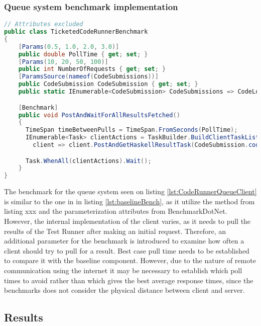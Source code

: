 \subsubsection{Queue system benchmark implementation}
\begin{lstlisting}[language=cs, escapechar=~, caption={C\# code showing xxxxxx}, label={lst:queueSystemBench}]
// Attributes excluded
public class TicketedCodeRunnerBenchmark
{
    [Params(0.5, 1.0, 2.0, 3.0)] 
    public double PollTime { get; set; }
    [Params(10, 20, 50, 100)] 
    public int NumberOfRequests { get; set; }
    [ParamsSource(nameof(CodeSubmissions))] 
    public CodeSubmission CodeSubmission { get; set; }
    public static IEnumerable<CodeSubmission> CodeSubmissions => CodeLoader.Load();

    [Benchmark]
    public void PostAndWaitForAllResultsFetched()
    {
      TimeSpan timeBetweenPulls = TimeSpan.FromSeconds(PollTime);
      IEnumerable<Task> clientActions = TaskBuilder.BuildClientTaskList<CodeRunnerQueueClient>(NumberOfConcurrentRequests, 
        client => client.PostAndGetHaskellResultTask(CodeSubmission.code, CodeSubmission.test, timeBetweenPulls));

      Task.WhenAll(clientActions).Wait();
    }
}
\end{lstlisting}

The benchmark for the queue system seen on listing \ref{lst:CodeRunnerQueueClient} is similar to the one in in listing \ref{lst:baselineBench}, as it utilize the method from listing xxx and the parameterization attributes from BenchmarkDotNet. However, the internal implementation of the client varies, as it needs to pull the results of the Test Runner after making an initial request. 
Therefore, an additional parameter for the benchmark is introduced to examine how often a client should try to pull for a result.
Best case pull time needs to be established to compare it with the baseline component. 
However, due to the nature of remote communication using the internet it may be necessary to establish which poll times to avoid rather than which gives the best average response times, since the benchmarks does not consider the physical distance between client and server.

\subsection{Results}
